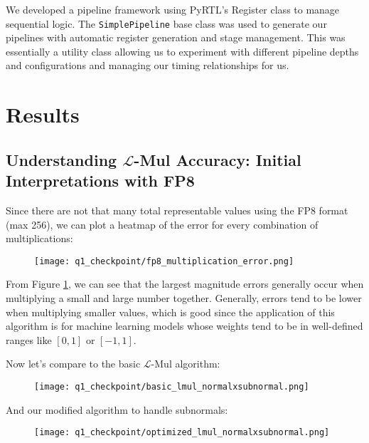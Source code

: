 \documentclass[12pt,letterpaper]{article}
\newcommand{\lmul}{$\mathcal{L}$-Mul\xspace}
\begin{document}
We developed a pipeline framework using PyRTL's Register class to manage sequential logic. The \texttt{SimplePipeline} base class was used to generate our pipelines with automatic register generation and stage management. This was essentially a utility class allowing us to experiment with different pipeline depths and configurations and managing our timing relationships for us.

\section{Results}

\begin{table}[htbp]
    \caption{BF16 \lmul Basic Analysis}
    \label{tab:bf16_lmul}
    \resizebox{1\linewidth}{!}{}
\end{table}

\subsection{Understanding \lmul Accuracy: Initial Interpretations with FP8}

Since there are not that many total representable values using the FP8 format (max 256), we can plot a heatmap of the error for every combination of multiplications:
\pagebreak
\begin{figure}[htbp]
    \centering
    \texttt{[image: q1\_checkpoint/fp8\_multiplication\_error.png]}
    \label{fig:fp8_multiplication_error}
\end{figure}

From Figure \ref{fig:fp8_multiplication_error}, we can see that the largest magnitude errors generally occur when multiplying a small and large number together. Generally, errors tend to be lower when multiplying smaller values, which is good since the application of this algorithm is for machine learning models whose weights tend to be in well-defined ranges like $[0,1]$ or $[-1,1]$.

Now let's compare to the basic \lmul algorithm:

\begin{figure}[htbp]
    \centering
    \texttt{[image: q1\_checkpoint/basic\_lmul\_normalxsubnormal.png]}
    \label{fig:basic_lmul_normalxsubnormal}
\end{figure}

And our modified algorithm to handle subnormals:
\pagebreak
\begin{figure}[htbp]
    \centering
    \texttt{[image: q1\_checkpoint/optimized\_lmul\_normalxsubnormal.png]}
    \label{fig:optimized_lmul_normalxsubnormal}
\end{figure}
\end{document}
